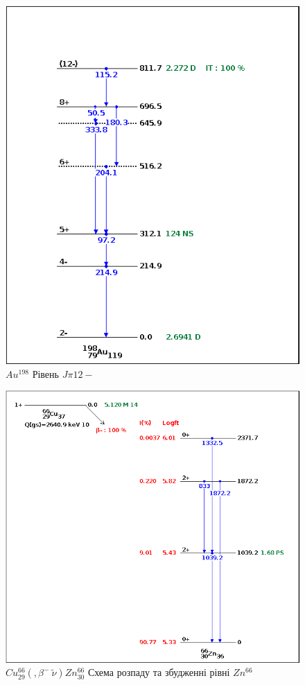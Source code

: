 \documentclass[a4paper, 14pt]{article}
\numberwithin{equation}{section}
\numberwithin{table}{section}
\begin{document}
\begin{figure}[!]
	\centering \includegraphics[width=1\textwidth]{images/au198levels.png}
	\caption{$Au^{198}$ Рівень $J\pi 12-$} 
	\label{ris:Au198Level12-}	
\end{figure} 
\begin{figure}[!]
	\centering \includegraphics[width=1\textwidth]{images/cu66lbetadecay.png}
	\caption{$Cu^{66}_{29}(,\beta^-\  \tilde{\nu})Zn^{66}_{30}$ Схема розпаду та збудженні рівні $Zn^{66}$} 
	\label{ris:ZnLevels-}	
\end{figure} 
\end{document}
